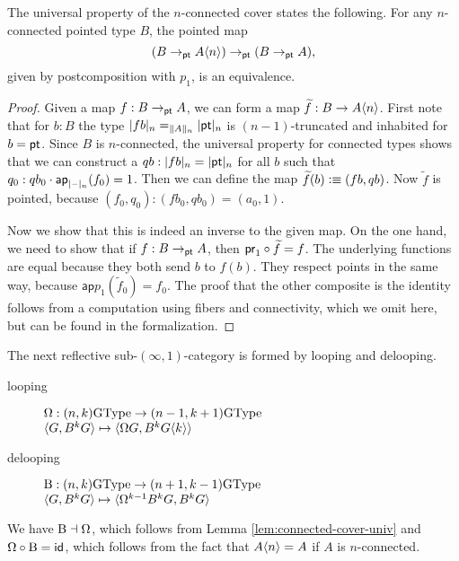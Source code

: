 \begin{lem} \label{lem:connected-cover-univ}
  The universal property of the $n$-connected cover states the following. For any $n$-connected pointed type $B$, the pointed map
  $$(B \to_\pt A{\angled n}) \to_\pt (B \to_\pt A),$$
  given by postcomposition with $p_1$, is an equivalence.\\
\end{lem}

\begin{proof}
  Given a map $f:B\to_\pt A$, we can form a map $\widetilde f: B \to A{\angled n}$. First note that for $b:B$ the type $\truncunit{fb}_n=_{\trunc{n}{A}}\truncunit{\pt}_n$ is $(n-1)$-truncated and inhabited for $b=\pt$. Since $B$ is $n$-connected, the universal property for connected types shows that we can construct a $qb:\truncunit{fb}_n=\truncunit{\pt}_n$ for all $b$ such that $q_0:qb_0\cdot\mathsf{ap}_{\truncunit{\blank}_n}(f_0)=1$. Then we can define the map $\widetilde f(b)\defeq (fb, qb)$. Now $\widetilde f$ is pointed, because $(f_0,q_0):(fb_0,qb_0)=(a_0,1)$.

  Now we show that this is indeed an inverse to the given map. On the one hand, we need to show that if $f: B \to_\pt A$, then $\proj 1 \circ \widetilde f=f$. The underlying functions are equal because they both send $b$ to $f(b)$. They respect points in the same way, because
  $\mathsf{ap}{p_1}(\widetilde f_0)=f_0$. The proof that the other composite is the identity follows from a computation using fibers and connectivity, which we omit here, but can be found in the formalization.
\end{proof}

The next reflective sub-$(\infty,1)$-category is formed by looping and delooping.
\begin{description}
\item[looping] $\loopspacesym : (n,k)\GType \to (n-1,k+1)\GType$ \\
  $\angled{G,B^kG} \mapsto \angled{\loopspacesym G,B^kG{\angled k}}$
\item[delooping] $\B : (n,k)\GType \to (n+1,k-1)\GType$ \\
  $\angled{G,B^kG} \mapsto \angled{\loopspacesym^{k-1}B^kG,B^kG}$
\end{description}
We have ${\B} \dashv {\loopspacesym}$, which follows from Lemma \ref{lem:connected-cover-univ} %
and $\loopspacesym\circ{\B} = \idfunc$, which follows from the fact that $A{\angled n}=A$ if $A$ is $n$-connected.


